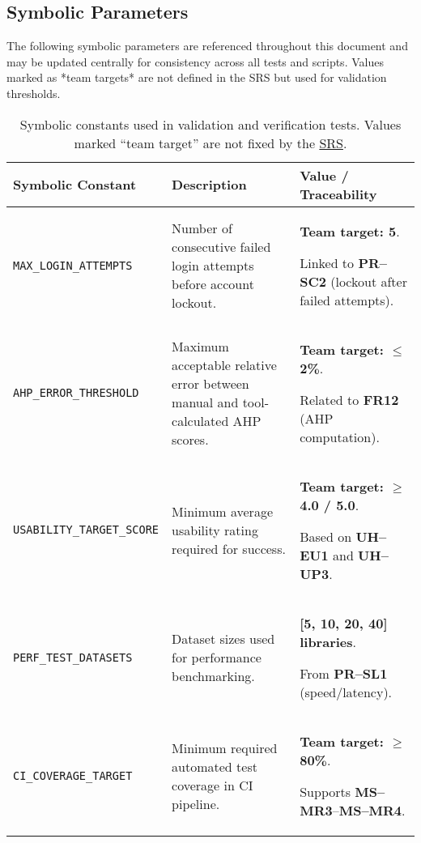 \documentclass[12pt, titlepage]{article}
\begin{document}

\subsection{Symbolic Parameters}
\label{sec:symbolic-parameters}

The following symbolic parameters are referenced throughout this document and
may be updated centrally for consistency across all tests and scripts. Values
marked as *team targets* are not defined in the SRS but used for validation
thresholds.

\begin{table}[H]
\centering
\begin{tabularx}{\textwidth}{@{}l X X@{}}
\toprule
\textbf{Symbolic Constant} & \textbf{Description} & \textbf{Value / Traceability} \\
\midrule

\texttt{MAX\_LOGIN\_ATTEMPTS} &
Number of consecutive failed login attempts before account lockout. &
\textbf{Team target: 5}.\par
Linked to \textbf{PR--SC2} (lockout after failed attempts). \\

\texttt{AHP\_ERROR\_THRESHOLD} &
Maximum acceptable relative error between manual and tool-calculated AHP scores. &
\textbf{Team target: $\leq$ 2\%}.\par
Related to \textbf{FR12} (AHP computation). \\

\texttt{USABILITY\_TARGET\_SCORE} &
Minimum average usability rating required for success. &
\textbf{Team target: $\geq$ 4.0 / 5.0}.\par
Based on \textbf{UH--EU1} and \textbf{UH--UP3}. \\

\texttt{PERF\_TEST\_DATASETS} &
Dataset sizes used for performance benchmarking. &
\textbf{[5, 10, 20, 40] libraries}.\par
From \textbf{PR--SL1} (speed/latency). \\

\texttt{CI\_COVERAGE\_TARGET} &
Minimum required automated test coverage in CI pipeline. &
\textbf{Team target: $\geq$ 80\%}.\par
Supports \textbf{MS--MR3}–\textbf{MS--MR4}. \\

\bottomrule
\end{tabularx}
\caption{Symbolic constants used in validation and verification tests. Values marked “team target” are not fixed by the \href{https://github.com/thaafei/DomainX/blob/main/docs/SRS/SRS.pdf}{SRS}.}
\end{table}
\end{document}
